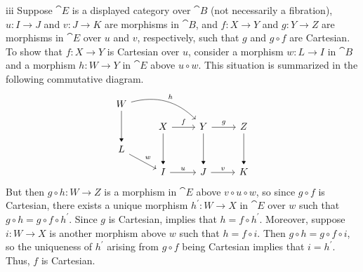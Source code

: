 \begin{partsolution}{iii}
Suppose \(\cat{E}\) is a displayed category over \(\cat{B}\) (not necessarily a fibration), \(u : I \to J\) and \(v : J \to K\) are morphisms in \(\cat{B}\), and \(f : X \to Y\) and \(g : Y \to Z\) are morphisms in \(\cat{E}\) over \(u\) and \(v\), respectively, such that \(g\) and \(g \circ f\) are Cartesian.
To show that \(f : X \to Y\) is Cartesian over \(u\), consider a morphism \(w : L \to I\) in \(\cat{B}\) and a morphism \(h : W \to Y\) in \(\cat{E}\) above \(u \circ w\).
This situation is summarized in the following commutative diagram.
\begin{equation*}
\begin{tikzcd}[row sep=small]
W \arrow[rrd, bend left, "h"] \arrow[dd, -Triangle] \\
& X \arrow[r, "f"] & Y \arrow[r, "g"] & Z \\
L \arrow[rd, "w"] \\
& I \arrow[r, "u"] & J \arrow[r, "v"] & K
\arrow[from=uull, to=ll, -Triangle, crossing over]
\arrow[from=uul, to=l, -Triangle, crossing over]
\arrow[from=uu, -Triangle, crossing over]
\end{tikzcd}
\end{equation*}
But then \(g \circ h : W \to Z\) is a morphism in \(\cat{E}\) above \(v \circ u \circ w\), so since \(g \circ f\) is Cartesian, there exists a unique morphism \(h^\prime : W \to X\) in \(\cat{E}\) over \(w\) such that \(g \circ h = g \circ f \circ h^\prime\).
Since \(g\) is Cartesian,  implies that \(h = f \circ h^\prime\).
Moreover, suppose \(i : W \to X\) is another morphism above \(w\) such that \(h = f \circ i\).
Then \(g \circ h = g \circ f \circ i\), so the uniqueness of \(h^\prime\) arising from \(g \circ f\) being Cartesian implies that \(i = h^\prime\).
Thus, \(f\) is Cartesian.
\end{partsolution}